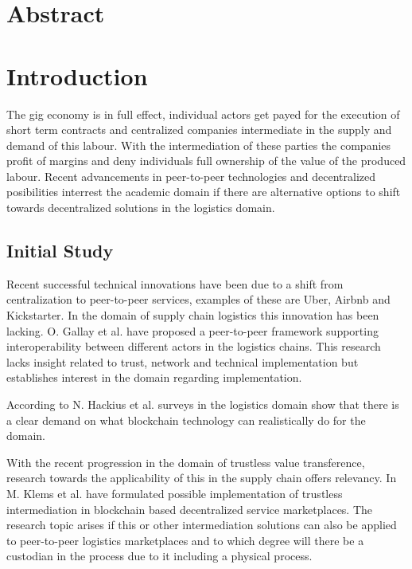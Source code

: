 \documentclass[Nomencl]{DylanMaster}
\begin{document}
\mytitlepage
\tableofcontents
\newpage

\section{Abstract}

\section{Introduction}

The gig economy is in full effect, individual actors get payed for the execution of short term contracts and centralized companies intermediate in the supply and demand of this labour. With the intermediation of these parties the companies profit of margins and deny individuals full ownership of the value of the produced labour. Recent advancements in peer-to-peer technologies and decentralized posibilities interrest the academic domain if there are alternative options to shift towards decentralized solutions in the logistics domain.\par

\subsection{Initial Study}

Recent successful technical innovations have been due to a shift from centralization to peer-to-peer services, examples of these are Uber, Airbnb and Kickstarter. In the domain of supply chain logistics this innovation has been lacking. O. Gallay et al. \cite{peer-to-peerDecentralizedLogistics} have proposed a peer-to-peer framework supporting interoperability between different actors in the logistics chains. This research lacks insight related to trust, network and technical implementation but establishes interest in the domain regarding implementation. \par
According to N. Hackius et al. \cite{hackius2017blockchain} surveys in the logistics domain show that there is a clear demand on what blockchain technology can realistically do for the domain. \par
With the recent progression in the domain of trustless value transference, research towards the applicability of this in the supply chain offers relevancy. In \cite{trustlessIntermediationInBCServiceMarket} M. Klems et al. have formulated possible implementation of trustless intermediation in blockchain based decentralized service marketplaces. The research topic arises if this or other intermediation solutions can also be applied to peer-to-peer logistics marketplaces and to which degree will there be a custodian in the process due to it including a physical process.
\end{document}
